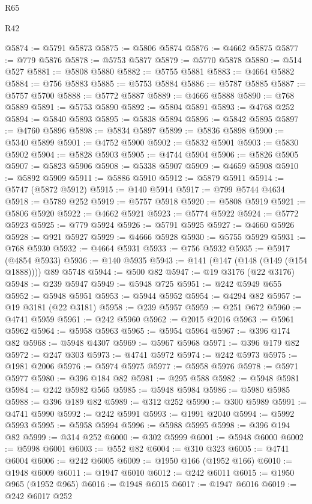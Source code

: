 \begin{lexlean}{R65}
\begin{lexlean}{R42}
\begin{coremodule}
{{{{{{{{{{{{{{{{{{{{{{{{{{{{{{{{{{{{{{{{{{{{{{{{{{{{{{{{{{{{{{{{{{{{{{{{{{{{{{{{{{{{{{{{{{{{{{{{{{{{{{{{{{{{{{{{{{{{{{{{{{{{{{{{{{{{{{{{{{{{{{{{{{{{{{{{{{{{{{{{{{{{{{{{{{{{{{{{{{{{{{{{@5874 := @5791 @5873
@5875 := @5806 @5874
@5876 := @4662 @5875
@5877 := @779 @5876
@5878 := @5753 @5877
@5879 := @5770 @5878
@5880 := @514 @527
@5881 := @5808 @5880
@5882 := @5755 @5881
@5883 := @4664 @5882
@5884 := @756 @5883
@5885 := @5753 @5884
@5886 := @5787 @5885
@5887 := @5757 @5700
@5888 := @5772 @5887
@5889 := @4666 @5888
@5890 := @768 @5889
@5891 := @5753 @5890
@5892 := @5804 @5891
@5893 := @4768 @252
@5894 := @5840 @5893
@5895 := @5838 @5894
@5896 := @5842 @5895
@5897 := @4760 @5896
@5898 := @5834 @5897
@5899 := @5836 @5898
@5900 := @5340 @5899
@5901 := @4752 @5900
@5902 := @5832 @5901
@5903 := @5830 @5902
@5904 := @5828 @5903
@5905 := @4744 @5904
@5906 := @5826 @5905
@5907 := @5823 @5906
@5908 := @5338 @5907
@5909 := @4659 @5908
@5910 := @5892 @5909
@5911 := @5886 @5910
@5912 := @5879 @5911
@5914 := @5747 (@5872 @5912)
@5915 := @140 @5914
@5917 := @799 @5744 @4634
@5918 := @5789 @252
@5919 := @5757 @5918
@5920 := @5808 @5919
@5921 := @5806 @5920
@5922 := @4662 @5921
@5923 := @5774 @5922
@5924 := @5772 @5923
@5925 := @779 @5924
@5926 := @5791 @5925
@5927 := @4660 @5926
@5928 := @921 @5927
@5929 := @4666 @5928
@5930 := @5755 @5929
@5931 := @768 @5930
@5932 := @4664 @5931
@5933 := @756 @5932
@5935 := @5917 (@4854 @5933)
@5936 := @140 @5935
@5943 := @141 (@147 (@148 (@149 (@154 @1888)))) @89 @5748
@5944 := @500 @82
@5947 := @19 @3176 (@22 @3176)
@5948 := @239 @5947
@5949 := @5948 @725
@5951 := @242 @5949 @655
@5952 := @5948 @5951
@5953 := @5944 @5952
@5954 := @4294 @82
@5957 := @19 @3181 (@22 @3181)
@5958 := @239 @5957
@5959 := @251 @672
@5960 := @4741 @5959
@5961 := @242 @5960
@5962 := @2015 @2016
@5963 := @5961 @5962
@5964 := @5958 @5963
@5965 := @5954 @5964
@5967 := @396 @174 @82
@5968 := @5948 @4307
@5969 := @5967 @5968
@5971 := @396 @179 @82
@5972 := @247 @303
@5973 := @4741 @5972
@5974 := @242 @5973
@5975 := @1981 @2006
@5976 := @5974 @5975
@5977 := @5958 @5976
@5978 := @5971 @5977
@5980 := @396 @184 @82
@5981 := @295 @588
@5982 := @5948 @5981
@5984 := @242 @5982 @565
@5985 := @5948 @5984
@5986 := @5980 @5985
@5988 := @396 @189 @82
@5989 := @312 @252
@5990 := @300 @5989
@5991 := @4741 @5990
@5992 := @242 @5991
@5993 := @1991 @2040
@5994 := @5992 @5993
@5995 := @5958 @5994
@5996 := @5988 @5995
@5998 := @396 @194 @82
@5999 := @314 @252
@6000 := @302 @5999
@6001 := @5948 @6000
@6002 := @5998 @6001
@6003 := @552 @82
@6004 := @310 @323
@6005 := @4741 @6004
@6006 := @242 @6005
@6009 := @1950 @166 (@1952 @166)
@6010 := @1948 @6009
@6011 := @1947 @6010
@6012 := @242 @6011
@6015 := @1950 @965 (@1952 @965)
@6016 := @1948 @6015
@6017 := @1947 @6016
@6019 := @242 @6017 @252
}}}}}}}}}}}}}}}}}}}}}}}}}}}}}}}}}}}}}}}}}}}}}}}}}}}}}}}}}}}}}}}}}}}}}}}}}}}}}}}}}}}}}}}}}}}}}}}}}}}}}}}}}}}}}}}}}}}}}}}}}}}}}}}}}}}}}}}}}}}}}}}}}}}}}}}}}}}}}}}}}}}}}}}}}}}}}}}}}}}}}}}}
\end{coremodule}
\end{lexlean}
\end{lexlean}

